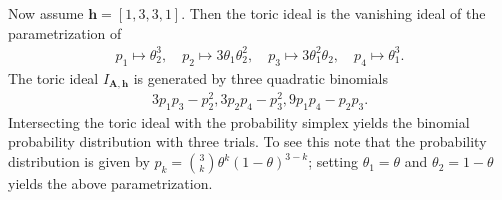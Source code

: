 \begin{eg}
  Now assume \( \mathbf h = [1,3,3,1] \). Then the toric ideal is the vanishing ideal of the parametrization of
  \begin{align*}
    p_1 \mapsto \theta_2^3, \quad p_2 \mapsto 3\theta_1\theta_2^2,\quad p_3 \mapsto 3\theta_1^2\theta_2, \quad p_4 \mapsto \theta_1^3.
  \end{align*}
  The toric ideal \( I_{\mathbf A, \mathbf h} \) is generated by three quadratic binomials 
  \begin{align*}
    3p_1p_3 - p_2^2, 3p_2p_4 - p_3^2, 9p_1p_4 - p_2p_3.
  \end{align*}
  Intersecting the toric ideal with the probability simplex yields the binomial probability distribution with three trials. To see this note that the probability distribution is given by \( p_k = {3 \choose k} \theta^{k} (1 - \theta)^{3 - k} \); setting \( \theta_1 = \theta \) and \( \theta_2 = 1 - \theta \) yields the above parametrization.
\end{eg}

